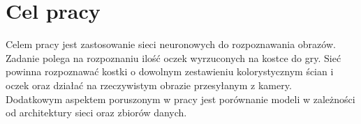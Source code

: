 
\chapter{Cel pracy}

Celem pracy jest zastosowanie sieci neuronowych do rozpoznawania obrazów.
Zadanie polega na rozpoznaniu ilość oczek wyrzuconych na kostce do gry.
Sieć powinna rozpoznawać kostki o dowolnym zestawieniu kolorystycznym
ścian i oczek oraz działać na rzeczywistym obrazie przesyłanym z kamery.\\
Dodatkowym aspektem poruszonym w pracy jest porównanie modeli w zależności od
architektury sieci oraz zbiorów danych.
